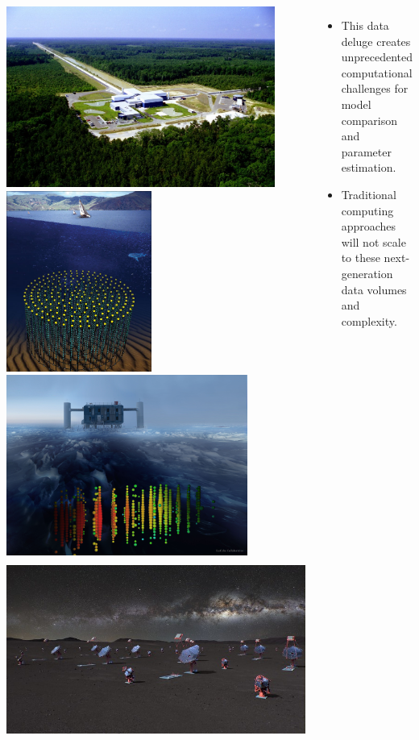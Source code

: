 \documentclass[aspectratio=169]{beamer}
\begin{document}
\begin{frame}
\begin{columns}
        \includegraphics[height=0.18428\textwidth]{figures/telescopes/ligo.jpg}%
        \includegraphics[height=0.18428\textwidth]{figures/telescopes/km3n.jpg}%
        \includegraphics[height=0.18428\textwidth]{figures/telescopes/icecube.jpg}%
        \includegraphics[height=0.18428\textwidth]{figures/telescopes/CTA.jpg}%

        \begin{itemize}
            \item This data deluge creates unprecedented computational challenges for model comparison and parameter estimation.
            \item Traditional computing approaches will not scale to these next-generation data volumes and complexity.
        \end{itemize}

    \end{columns}
\end{frame}
\end{document}
